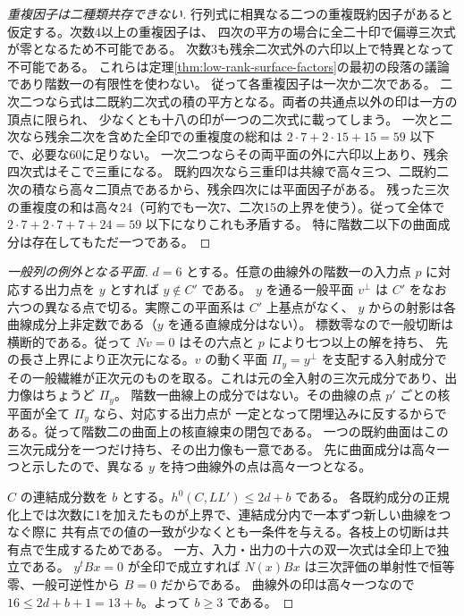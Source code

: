 \begin{proof}[重複因子は二種類共存できない]
行列式に相異なる二つの重複既約因子があると仮定する。次数4以上の重複因子は、
四次の平方の場合に全二十印で偏導三次式が零となるため不可能である。
次数3も残余二次式外の六印以上で特異となって不可能である。
これらは定理\ref{thm:low-rank-surface-factors}の最初の段落の議論であり階数一の有限性を使わない。
従って各重複因子は一次か二次である。
二次二つなら式は二既約二次式の積の平方となる。両者の共通点以外の印は一方の頂点に限られ、
少なくとも十八の印が一つの二次式に載ってしまう。
一次と二次なら残余二次を含めた全印での重複度の総和は $2\cdot7+2\cdot15+15=59$ 以下で、必要な60に足りない。
一次二つならその両平面の外に六印以上あり、残余四次式はそこで三重になる。
既約四次なら三重印は共線で高々三つ、二既約二次の積なら高々二頂点であるから、残余四次には平面因子がある。
残った三次の重複度の和は高々24（可約でも一次7、二次15の上界を使う）。従って全体で
$2\cdot7+2\cdot7+7+24=59$ 以下になりこれも矛盾する。
特に階数二以下の曲面成分は存在してもただ一つである。
\end{proof}
\begin{proof}[一般列の例外となる平面]
$d=6$ とする。任意の曲線外の階数一の入力点 $p$ に対応する出力点を $y$ とすれば $y\notin C'$ である。
$y$ を通る一般平面 $v^\perp$ は $C'$ をなお六つの異なる点で切る。実際この平面系は $C'$ 上基点がなく、
$y$ からの射影は各曲線成分上非定数である（$y$ を通る直線成分はない）。
標数零なので一般切断は横断的である。従って $Nv=0$ はその六点と $p$ により七つ以上の解を持ち、
先の長さ上界により正次元になる。$v$ の動く平面 $\Pi_y=y^\perp$ を支配する入射成分で
その一般繊維が正次元のものを取る。これは元の全入射の三次元成分であり、出力像はちょうど $\Pi_y$。
階数一曲線上の成分ではない。その曲線の点 $p'$ ごとの核平面が全て $\Pi_y$ なら、対応する出力点が
一定となって閉埋込みに反するからである。従って階数二の曲面上の核直線束の閉包である。
一つの既約曲面はこの三次元成分を一つだけ持ち、その出力像も一意である。
先に曲面成分は高々一つと示したので、異なる $y$ を持つ曲線外の点は高々一つとなる。

$C$ の連結成分数を $b$ とする。$h^0(C,L L')\le 2d+b$ である。
各既約成分の正規化上では次数に1を加えたものが上界で、連結成分内で一本ずつ新しい曲線をつなぐ際に
共有点での値の一致が少なくとも一条件を与える。各枝上の切断は共有点で生成するためである。
一方、入力・出力の十六の双一次式は全印上で独立である。
$y^tBx=0$ が全印で成立すれば $N(x)Bx$ は三次評価の単射性で恒等零、一般可逆性から $B=0$ だからである。
曲線外の印は高々一つなので $16\le 2d+b+1=13+b$。よって $b\ge3$ である。
\end{proof}

